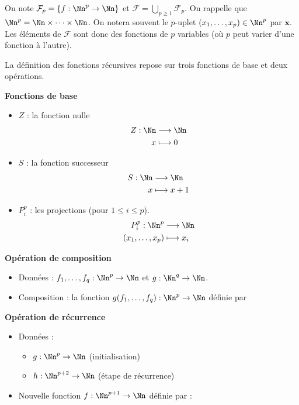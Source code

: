 \documentclass[11pt,class=report,crop=false]{standalone}
\begin{document}
On note $\mathcal{F}_p = \{f : \Nn^p \to \Nn \}$ et $\mathcal{F} = \bigcup_{p \ge 1} \mathcal{F}_p$.
On rappelle que $\Nn^p = \Nn \times \dots \times \Nn$. On notera souvent le $p$-uplet $(x_1, \dots, x_p) \in \Nn^p$ par $\mathbf{x}$. Les éléments de $\mathcal{F}$ sont donc des fonctions de $p$ variables (où $p$ peut varier d'une fonction à l'autre).

La définition des fonctions récursives repose sur trois fonctions de base et deux opérations.

\textbf{Fonctions de base}

\begin{itemize}
    \item $Z$ : la fonction nulle
    \begin{align*}
        Z : \Nn &\longrightarrow \Nn \\
        x &\longmapsto 0
    \end{align*}
    
    \item $S$ : la fonction successeur
    \begin{align*}
        S : \Nn &\longrightarrow \Nn \\
        x &\longmapsto x+1
    \end{align*}
    
    \item $P_i^p$ : les projections (pour $1 \le i \le p$).
    \begin{align*}
        P_i^p : \Nn^p &\longrightarrow \Nn \\
        (x_1, \dots, x_p) &\longmapsto x_i
    \end{align*}
\end{itemize}

\textbf{Opération de composition}

\begin{itemize}
    \item Données : $f_1, \dots, f_q : \Nn^p \to \Nn$ et $g : \Nn^q \to \Nn$.
    \item Composition : la fonction $g(f_1, \dots, f_q) : \Nn^p \to \Nn$ définie par
\end{itemize}

\textbf{Opération de récurrence}

\begin{itemize}
    \item Données :
    \begin{itemize}
        \item $g : \Nn^p \to \Nn$ \quad (initialisation)
        \item $h : \Nn^{p+2} \to \Nn$ \quad (étape de récurrence)
    \end{itemize}
    \item Nouvelle fonction $f : \Nn^{p+1} \to \Nn$ définie par :
\end{itemize}
\end{document}
